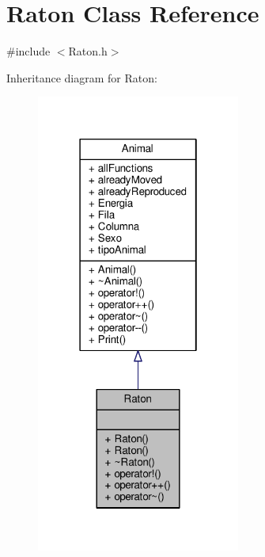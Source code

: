 \hypertarget{classRaton}{}\section{Raton Class Reference}
\label{classRaton}


{\ttfamily \#include $<$Raton.\+h$>$}



Inheritance diagram for Raton\+:\nopagebreak
\begin{figure}[H]
\begin{center}
\leavevmode
\includegraphics[width=190pt]{classRaton__inherit__graph}
\end{center}
\end{figure}


